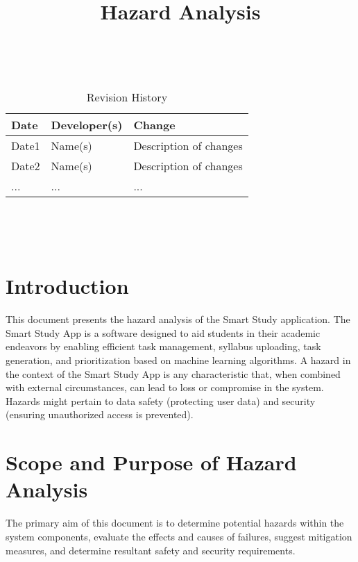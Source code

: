 \documentclass{article}
\title{Hazard Analysis\\\progname}
\author{\authname}
\date{}
\begin{document}
\maketitle
\thispagestyle{empty}

~\newpage


\begin{table}[hp]
\caption{Revision History} \label{TblRevisionHistory}
\begin{tabularx}{\textwidth}{llX}
\toprule
\textbf{Date} & \textbf{Developer(s)} & \textbf{Change}\\
\midrule
Date1 & Name(s) & Description of changes\\
Date2 & Name(s) & Description of changes\\
... & ... & ...\\
\bottomrule
\end{tabularx}
\end{table}

~\newpage

\tableofcontents

~\newpage



\section{Introduction}
This document presents the hazard analysis of the Smart Study application. The Smart Study App is a software designed to aid students in their academic endeavors by enabling efficient task management, syllabus uploading, task generation, and prioritization based on machine learning algorithms.
A hazard in the context of the Smart Study App is any characteristic that, when combined with external circumstances, can lead to loss or compromise in the system. Hazards might pertain to data safety (protecting user data) and security (ensuring unauthorized access is prevented).

\section{Scope and Purpose of Hazard Analysis}
The primary aim of this document is to determine potential hazards within the system components, evaluate the effects and causes of failures, suggest mitigation measures, and determine resultant safety and security requirements.
\end{document}
